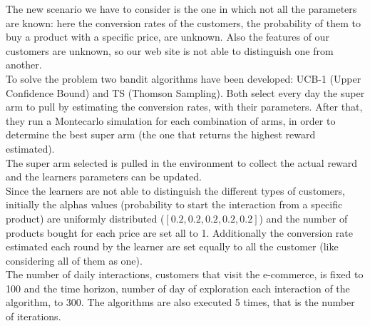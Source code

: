The new scenario we have to consider is the one in which not all the parameters are known: here the conversion rates of the customers, the probability of them to buy a product with a specific price, are unknown. Also the features of our customers are unknown, so our web site is not able to distinguish one from another. \\
To solve the problem two bandit algorithms have been developed: UCB-1 (Upper Confidence Bound) and TS (Thomson Sampling).
Both select every day the super arm to pull by estimating the conversion rates, with their parameters. After that, they run a Montecarlo simulation for each combination of arms, in order to determine the best super arm (the one that returns the highest reward estimated).\\
The super arm selected is pulled in the environment to collect the actual reward and the learners parameters can be updated.\\
Since the learners are not able to distinguish the different types of customers, initially the alphas values (probability to start the interaction from a specific product) are uniformly distributed ($[0.2, 0.2, 0.2, 0.2, 0.2]$) and the number of products bought for each price are set all to 1. Additionally the conversion rate estimated each round by the learner are set equally to all the customer (like considering all of them as one).\\
The number of daily interactions, customers that visit the e-commerce, is fixed to 100 and the time horizon, number of day of exploration each interaction of the algorithm, to 300. The algorithms are also executed 5 times, that is the number of iterations.

